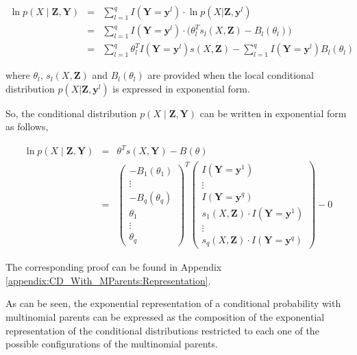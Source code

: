 \documentclass[11pt, oneside]{article}   	%
\newcommand{\bm}{\mathbf}
\numberwithin{figure}{section}
\numberwithin{equation}{section}
\numberwithin{table}{section}
\theoremstyle{definition}
\begin{document}
\begin{eqnarray*}
\ln p(X \mid \bm Z, \bm Y) &=&  \sum_{l=1}^q I(\mathbf{Y} =\mathbf{y}^l) \cdot \ln p(X | \bm Z, \mathbf{y}^l) \\
&=& \sum_{l=1}^q I(\mathbf{Y} =\mathbf{y}^l) \cdot \Big(  \theta_{l}^T s_l(X, \bm Z)  -  B_l(\theta_{l}) \Big)\\
&=& \sum_{l=1}^q \theta_{l}^T  I(\mathbf{Y} =\mathbf{y}^l) s(X, \bm Z) - \sum_{l=1}^q I(\mathbf{Y} =\mathbf{y}^l) B_l(\theta_{l})
\end{eqnarray*}

\noindent where $\theta_l$, $s_l(X,\bm Z)$ and $B_l(\theta_l)$ are provided when the local conditional distribution $p(X | \bm Z, \mathbf{y}^l)$ is expressed in exponential form. 

So, the conditional distribution $p(X \mid \bm Z, \bm Y)$ can be written in exponential form as follows, 

\begin{eqnarray}
\label{Equation:CD_With_MParents:Representation}
\ln p(X \mid \bm Z, \bm Y)  &=& \theta^T s(X,\mathbf{Y}) - B(\theta) \nonumber \\
&=&
\begin{pmatrix}
- B_1(\theta_{1}) \\
\vdots \\
- B_q(\theta_{q}) \\
\theta_{1} \\
\vdots \\
\theta_{q}
\end{pmatrix}^T
\begin{pmatrix}
I(\mathbf{Y} =\mathbf{y}^1) \\
\vdots \\
I(\mathbf{Y} =\mathbf{y}^q) \\
s_1(X, \bm Z) \cdot I(\mathbf{Y} =\mathbf{y}^1) \\
\vdots \\
s_q(X, \bm Z) \cdot I(\mathbf{Y} =\mathbf{y}^q)
\end{pmatrix}
- 0 
\end{eqnarray}

The corresponding proof can be found in Appendix \ref{appendix:CD_With_MParents:Representation}.

As can be seen, the exponential representation of a conditional probability with multinomial parents can be expressed as the composition of the exponential representation of the conditional distributions restricted to each one of the possible configurations of the multinomial parents. 
\end{document}
